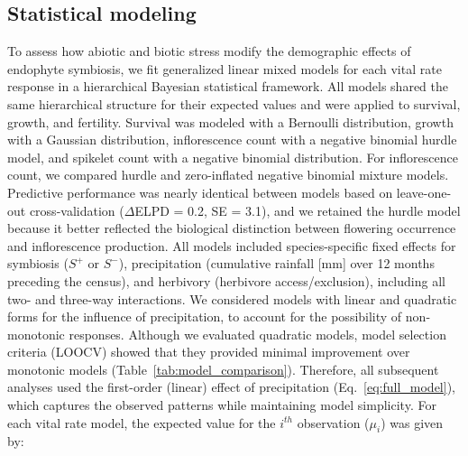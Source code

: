 \documentclass[12pt]{article}\usepackage[]{graphicx}\usepackage[dvipsnames]{xcolor}
\begin{document}
\subsection*{Statistical modeling}
To assess how abiotic and biotic stress modify the demographic effects of endophyte symbiosis, we fit generalized linear mixed models for each vital rate response in a hierarchical Bayesian statistical framework. %
All models shared the same hierarchical structure for their expected values and were applied to survival, growth, and fertility.
Survival was modeled with a Bernoulli distribution, growth with a Gaussian distribution, inflorescence count with a negative binomial hurdle model, and spikelet count with a negative binomial distribution. 
For inflorescence count, we compared hurdle and zero-inflated negative binomial mixture models. Predictive performance was nearly identical between models based on leave-one-out cross-validation ($\Delta$ELPD = 0.2, SE = 3.1), and we retained the hurdle model because it better reflected the biological distinction between flowering occurrence and inflorescence production.
All models included species-specific fixed effects for symbiosis ($S^+$ or $S^-$), precipitation (cumulative rainfall [mm] over 12 months preceding the census), and herbivory (herbivore access/exclusion), including all two- and three-way interactions. 
We considered models with linear and quadratic forms for the influence of precipitation, to account for the possibility of non-monotonic responses. 
Although we evaluated quadratic models, model selection criteria (LOOCV) showed that they provided minimal improvement over monotonic models (Table~\ref{tab:model_comparison}). 
Therefore, all subsequent analyses used the first-order (linear) effect of precipitation (Eq.~\ref{eq:full_model}), which captures the observed patterns while maintaining model simplicity.
For each vital rate model, the expected value for the $i^{th}$ observation ($\mu_{i}$) was given by:
\end{document}
